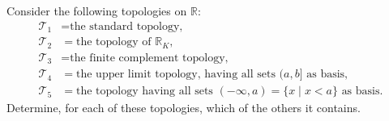 \documentclass[12pt]{article}
\theoremstyle{remark}
\begin{document}
\begin{problem}\label{exc:13.7}
  Consider the following topologies on $\mathbb{R}$:
  \begin{align*}
    \mathcal{T}_1 &= \text{the standard topology,}\\
    \mathcal{T}_2 &= \text{the topology of $\mathbb{R}_K$,}\\
    \mathcal{T}_3 &= \text{the finite complement topology,}\\
    \mathcal{T}_4 &= \text{the upper limit topology, having all sets $(a,b]$ as basis,}\\
    \mathcal{T}_5 &= \text{the topology having all sets $(-\infty,a) = \{x \mid x < a\}$ as basis.}
  \end{align*}
  Determine, for each of these topologies, which of the others it contains.
\end{problem}
\end{document}
